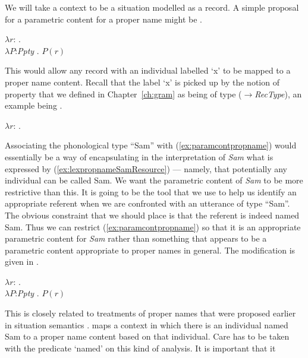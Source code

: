 We will take a context to be a situation
modelled as a record.  A simple proposal for a parametric content for
a proper name might be \nexteg{}.
\begin{ex} 
$\lambda r$: . \\
\hspace*{1em}$\lambda P$:\textit{Ppty} . $P(r)$
\label{ex:paramcontpropname} 
\end{ex} 
This would allow any record with an individual labelled `x' to be
mapped to a proper name content.  Recall that the label `x' is picked
up by the notion of property that we defined in Chapter~\ref{ch:gram}
as being of type
($\rightarrow$\textit{RecType}),
an example being \nexteg{}. 
\begin{ex} 
$\lambda r$: .  
\end{ex} 
Associating the phonological type ``Sam'' with
(\ref{ex:paramcontpropname}) would essentially be a way of
encapsulating in the interpretation of \textit{Sam} what is expressed
by (\ref{ex:lexpropnameSamResource}) --- namely, that potentially any
individual can be called Sam.  We want the parametric content of
\textit{Sam} to be
more restrictive than this.  It is going to be the tool that we use to
help us identify an appropriate referent when we are confronted with
an utterance of type ``Sam''.  The obvious constraint that we should
place is that the referent is indeed named Sam.  Thus we can restrict
(\ref{ex:paramcontpropname}) so that it is an appropriate parametric
content for \textit{Sam} rather than something that appears to be a
parametric content appropriate to proper names in general.  The
modification is given in \nexteg{}.
\begin{ex} 
$\lambda r$: . \\
\hspace*{5em}$\lambda P$:\textit{Ppty} . $P(r)$ 
\label{ex:parametricSam}
\end{ex} 
This is closely related to treatments of proper
names that were proposed earlier in situation semantics
\citep{GawronPeters1990,Cooper1991,BarwiseCooper1993}.   \preveg{}
maps a context in which there is an individual named Sam to a proper
name content based on that individual.  Care has to be taken with the
predicate `named' on this kind of analysis.  It is important that it
